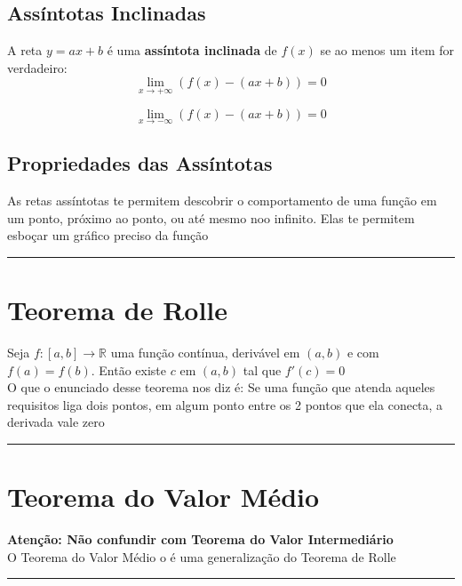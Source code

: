 \documentclass{article}
\begin{document}
\subsection{Assíntotas Inclinadas}
A reta \( y = ax + b \) é uma \textbf{assíntota inclinada} de \( f(x) \) se ao menos um item for verdadeiro:
\[
\lim_{x \to +\infty} \left( f(x) - (ax + b) \right) = 0
\]

\[
\lim_{x \to -\infty} \left( f(x) - (ax + b) \right) = 0
\]

\subsection{Propriedades das Assíntotas}
As retas assíntotas te permitem descobrir o comportamento de uma função em um ponto, próximo ao ponto, ou até mesmo noo infinito. Elas te permitem esboçar um gráfico preciso da função
\vspace{15pt}
\hrule
\section{Teorema de Rolle}
Seja $f: [a, b] \xrightarrow{} \mathbb{R}$ uma função contínua, derivável em $(a, b)$ e com $f(a) = f(b)$. Então existe $c$ em $(a, b)$ tal que $f'(c) = 0$\\[10pt]
O que o enunciado desse teorema nos diz é: Se uma função que atenda aqueles requisitos liga dois pontos, em algum ponto entre os 2 pontos que ela conecta, a derivada vale zero
\vspace{15pt}
\hrule

\section{Teorema do Valor Médio}
\textbf{Atenção: Não confundir com Teorema do Valor Intermediário}\\[10pt]
O Teorema do Valor Médio o é uma generalização do Teorema de Rolle
\vspace{15pt}
\hrule
\end{document}
